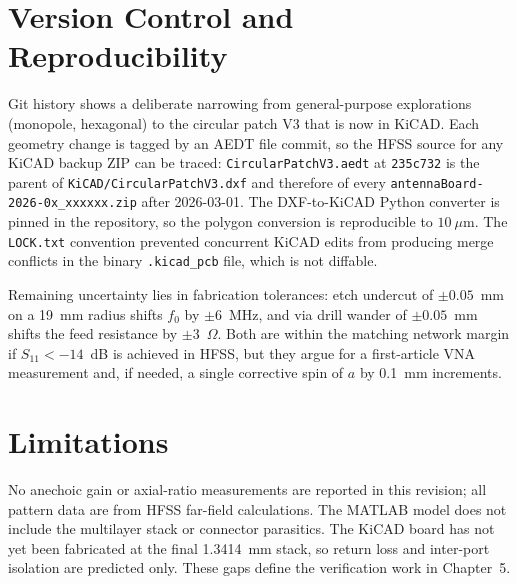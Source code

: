 \section{Version Control and Reproducibility}

Git history shows a deliberate narrowing from general-purpose explorations (monopole, hexagonal) to the circular patch V3 that is now in KiCAD. Each geometry change is tagged by an AEDT file commit, so the HFSS source for any KiCAD backup ZIP can be traced: \texttt{CircularPatchV3.aedt} at \texttt{235c732} is the parent of \texttt{KiCAD/CircularPatchV3.dxf} and therefore of every \texttt{antennaBoard-2026-0x\_xxxxxx.zip} after 2026-03-01. The DXF-to-KiCAD Python converter is pinned in the repository, so the polygon conversion is reproducible to $10~\mu$m. The \texttt{LOCK.txt} convention prevented concurrent KiCAD edits from producing merge conflicts in the binary \texttt{.kicad\_pcb} file, which is not diffable.

Remaining uncertainty lies in fabrication tolerances: etch undercut of $\pm 0.05$~mm on a 19~mm radius shifts $f_0$ by $\pm 6$~MHz, and via drill wander of $\pm 0.05$~mm shifts the feed resistance by $\pm 3$~$\Omega$. Both are within the matching network margin if $S_{11} < -14$~dB is achieved in HFSS, but they argue for a first-article VNA measurement and, if needed, a single corrective spin of $a$ by 0.1~mm increments.

\section{Limitations}

No anechoic gain or axial-ratio measurements are reported in this revision; all pattern data are from HFSS far-field calculations. The MATLAB model does not include the multilayer stack or connector parasitics. The KiCAD board has not yet been fabricated at the final 1.3414~mm stack, so return loss and inter-port isolation are predicted only. These gaps define the verification work in Chapter~5.
